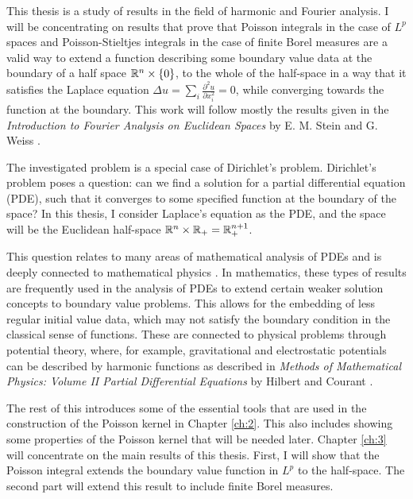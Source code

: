 This thesis is a study of results in the field of harmonic and Fourier analysis. I will be concentrating on results that prove that Poisson integrals in the case of $L^p$ spaces and Poisson-Stieltjes integrals in the case of finite Borel measures are a valid way to extend a function describing some boundary value data at the boundary of a half space $\mathbb R^n\times\{0\}$, to the whole of the half-space in a way that it satisfies the Laplace equation $\Delta u=\sum_i \frac{\partial^2 u}{\partial x_i^2}=0$, while converging towards the function at the boundary. This work will follow mostly the results given in the \textit{Introduction to Fourier Analysis on Euclidean Spaces} by E. M. Stein and G. Weiss \cite{stein_weiss}.

The investigated problem is a special case of Dirichlet's problem. Dirichlet's problem poses a question: can we find a solution for a partial differential equation (PDE), such that it converges to some specified function at the boundary of the space? In this thesis, I consider Laplace's equation as the PDE, and the space will be the Euclidean half-space $\mathbb R^n\times\mathbb R_+=\mathbb R^{n+1}_+$.

This question relates to many areas of mathematical analysis of PDEs \cite{evans, John1978} and is deeply connected to mathematical physics \cite{hilbert}. In mathematics, these types of results are frequently used in the analysis of PDEs to extend certain weaker solution concepts to boundary value problems. This allows for the embedding of less regular initial value data, which may not satisfy the boundary condition in the classical sense of functions. These are connected to physical problems through potential theory, where, for example, gravitational and electrostatic potentials can be described by harmonic functions as described in \textit{Methods of Mathematical Physics: Volume
II Partial Differential Equations} by Hilbert and Courant \cite{hilbert}.

The rest of this introduces some of the essential tools that are used in the construction of the Poisson kernel in Chapter \ref{ch:2}. This also includes showing some properties of the Poisson kernel that will be needed later. Chapter \ref{ch:3} will concentrate on the main results of this thesis. First, I will show that the Poisson integral extends the boundary value function in $L^p$ to the half-space. The second part will extend this result to include finite Borel measures.